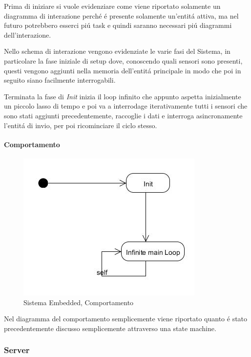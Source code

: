 Prima di iniziare si vuole evidenziare come viene riportato solamente un diagramma di interazione perch\'e \'e presente solamente un'entit\'a attiva, ma nel futuro potrebbero esserci pi\'u task e quindi saranno necessari pi\'u diagrammi dell'interazione.

Nello schema di interazione vengono evidenziate le varie fasi del Sistema, in particolare la fase iniziale di setup dove, conoscendo quali sensori sono presenti, questi vengono aggiunti nella memoria dell'entit\'a principale in modo che poi in seguito siano facilmente interrogabili.

Terminata la fase di \textit{Init} inizia il loop infinito che appunto aspetta inizialmente un piccolo lasso di tempo e poi va a interrodage iterativamente tutti i sensori che sono stati aggiunti precedentemente, raccoglie i dati e interroga asincronamente l'entit\'a di invio, per poi ricominciare il ciclo stesso.

\paragraph{Comportamento}

\begin{figure}[h]
\centering
\includegraphics[scale=0.5]{Figures/DomainModel/EmbeddedSystem/Behaviour}
\caption{Sistema Embedded, Comportamento}
\end{figure}


Nel diagramma del comportamento semplicemente viene riportato quanto \'e stato precedentemente discusso semplicemente attraverso una state machine.

\subsubsection{Server}

